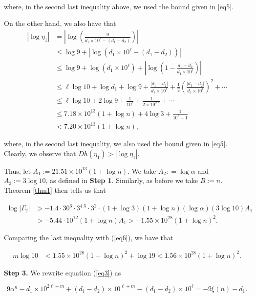 \documentclass[10pt,a4paper]{article}
\begin{document}
\noindent where, in the second last inequality above, we used the bound given in \eqref{eq5}. 

\noindent
On the other hand, we also have that
\begin{align*}
|\log \eta_1| & = \left| \log \left(\frac{9}{d_1 \times 10^\ell - (d_1-d_2)} \right) \right| \\
& \leq  \log 9 + |\log (d_1 \times 10^\ell - (d_1-d_2))|\\
& \leq  \log 9 + \log (d_1 \times 10^\ell) + \left| \log \left( 1 - \frac{d_1 - d_2}{d_1 \times 10^\ell}  \right)  \right|\\
& \leq \ell \log 10 + \log d_1 + \log 9  + \frac{|d_1 - d_2|}{d_1 \times 10^\ell} + \frac{1}{2} \left(  \frac{|d_1 - d_2|}{d_1 \times 10^\ell} \right)^2 + \cdots \\
& \leq \ell \log 10 + 2 \log 9 + \frac{1}{10^\ell} + \frac{1}{2 \times 10^{2\ell}} + \cdots\\
& \leq 7.18 \times 10^{13}(1 + \log n) + 4 \log 3 + \frac{1}{10^\ell - 1} \\
& < 7.20 \times 10^{13}(1 + \log n),
\end{align*}

\noindent where, in the second last inequality, we also used the bound given in \eqref{eq5}. Clearly,  we observe that $D h(\eta_1) > |\log \eta_1|$.

\noindent Thus,  let $A_1 := 21.51 \times 10^{13} (1 + \log n)$. We take $A_2: = \log \alpha$ and $A_3 := 3 \log 10$, as defined in \textbf{Step 1}. Similarly, as before we take $B := n$.  Theorem \ref{thm1} then tells us that

\begin{align*}
\log |\Gamma_2| & > -1.4 \cdot  30^6 \cdot 3^{4.5} \cdot 3^2 \cdot (1 + \log 3)(1 + \log n)(\log \alpha)(3 \log 10)A_1\\
& > -5.44 \cdot 10^{12}(1 + \log n)A_1 > -1.55 \times 10^{28}(1 + \log n)^2.
\end{align*}

\noindent Comparing the last inequality with (\ref{eq6}), we have that

\begin{align}\label{eq7}
m \log 10 & < 1.55 \times 10^{28}(1 + \log n)^2 + \log 19 < 1.56 \times 10^{28}(1+\log n)^2.
\end{align}

\noindent \textbf{Step 3.} We rewrite equation (\ref{eq3}) as 

\begin{equation*}
9 \alpha^n  - d_1 \times 10^{2\ell + m} + (d_1-d_2)\times 10^{\ell+m} - (d_1-d_2)\times 10^\ell = -9\xi(n) - d_1.
\end{equation*}
\end{document}
